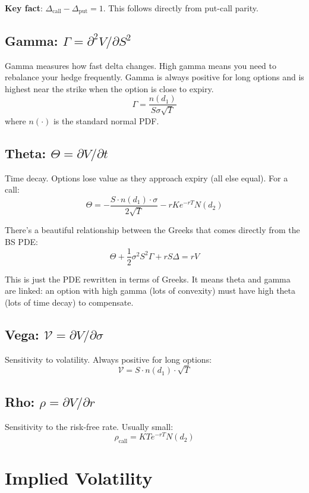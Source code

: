 \documentclass[11pt]{article}
\begin{document}
\textbf{Key fact}: $\Delta_{\text{call}} - \Delta_{\text{put}} = 1$. This follows directly from put-call parity.

\subsection{Gamma: $\Gamma = \partial^2 V / \partial S^2$}

Gamma measures how fast delta changes. High gamma means you need to rebalance your hedge frequently. Gamma is always positive for long options and is highest near the strike when the option is close to expiry.
\[
\Gamma = \frac{n(d_1)}{S\sigma\sqrt{T}}
\]
where $n(\cdot)$ is the standard normal PDF.

\subsection{Theta: $\Theta = \partial V / \partial t$}

Time decay. Options lose value as they approach expiry (all else equal). For a call:
\[
\Theta = -\frac{S \cdot n(d_1) \cdot \sigma}{2\sqrt{T}} - rKe^{-rT}N(d_2)
\]

There's a beautiful relationship between the Greeks that comes directly from the BS PDE:
\[
\Theta + \frac{1}{2}\sigma^2 S^2 \Gamma + rS\Delta = rV
\]

This is just the PDE rewritten in terms of Greeks. It means theta and gamma are linked: an option with high gamma (lots of convexity) must have high theta (lots of time decay) to compensate.

\subsection{Vega: $\mathcal{V} = \partial V / \partial \sigma$}

Sensitivity to volatility. Always positive for long options:
\[
\mathcal{V} = S \cdot n(d_1) \cdot \sqrt{T}
\]

\subsection{Rho: $\rho = \partial V / \partial r$}

Sensitivity to the risk-free rate. Usually small:
\[
\rho_{\text{call}} = KTe^{-rT}N(d_2)
\]

\section{Implied Volatility}
\end{document}
